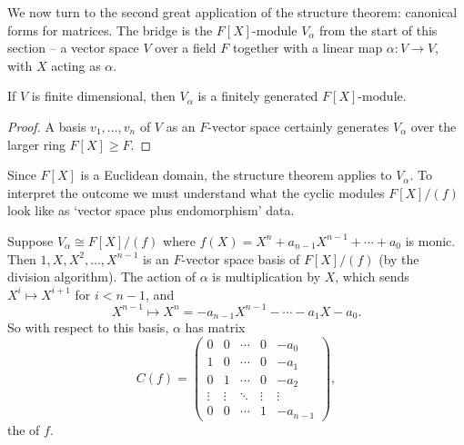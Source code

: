 We now turn to the second great application of the structure theorem: canonical forms for matrices. The bridge is the $F[X]$-module $V_{\alpha}$ from the start of this section -- a vector space $V$ over a field $F$ together with a linear map $\alpha: V \rightarrow V$, with $X$ acting as $\alpha$.

\begin{lemma}
	If $V$ is finite dimensional, then $V_{\alpha}$ is a finitely generated $F[X]$-module.
\end{lemma}
\begin{proof}
	A basis $v_1, \dots, v_n$ of $V$ as an $F$-vector space certainly generates $V_\alpha$ over the larger ring $F[X] \geq F$.
\end{proof}

Since $F[X]$ is a Euclidean domain, the structure theorem applies to $V_\alpha$. To interpret the outcome we must understand what the cyclic modules $F[X]/(f)$ look like as `vector space plus endomorphism' data.

\begin{example}
	Suppose $V_{\alpha} \cong F[X]/(f)$ where $f(X) = X^n + a_{n - 1}X^{n -1} + \cdots + a_0$ is monic. Then $1, X, X^2, \dots, X^{n - 1}$ is an $F$-vector space basis of $F[X]/(f)$ (by the division algorithm). The action of $\alpha$ is multiplication by $X$, which sends $X^i \mapsto X^{i + 1}$ for $i < n - 1$, and
	$$
	X^{n - 1} \longmapsto X^n = -a_{n-1}X^{n - 1} - \cdots - a_1 X - a_0.
	$$
	So with respect to this basis, $\alpha$ has matrix
	$$
	C(f) = \begin{pmatrix}
		0 & 0 & \cdots & 0 & -a_0 \\
		1 & 0 & \cdots & 0 & -a_1 \\
		0 & 1 & \cdots & 0 & -a_2 \\
		\vdots & \vdots & \ddots & \vdots & \vdots \\
		0 & 0 & \cdots & 1 & -a_{n - 1}
	\end{pmatrix},
	$$
	the  of $f$.
\end{example}

